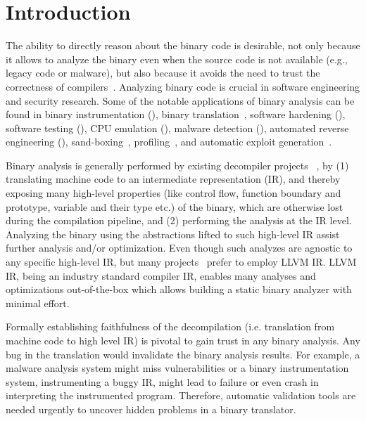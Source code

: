 \section{Introduction}
\label{sec:Intro}

The ability to directly reason about the binary code is desirable, not only because it allows to analyze the binary even when the source code is not available (e.g., legacy code or malware), but also because it avoids the need to trust the correctness of compilers~\cite{Thompson,WYSINWYE}.
Analyzing binary code is crucial in software engineering and security research.
Some of the notable applications of binary analysis can be found in binary
instrumentation
(\cite{Bruening:CGO2003,PEBIL10,Pin:2005,Valgrind:ENTCS03,DynamoRIO:2004}),
binary translation~\cite{UQBT:2000}, software hardening
(\cite{Cha:2015,Ford:2008,Zhang,Zhang:2013}), software testing
(\cite{Chipounov:2011,Avgerinos:2014,godefroid_automated_2008}), CPU
emulation (\cite{QEMU:USENIX05,Magnusson:2002}), malware detection
(\cite{Christodorescu:2005,Kruegel:2004,BitBlaze:2008,BAP:CAV11,Egele:USENIX07,Yin:CCS07}),
automated reverse engineering
(\cite{Cui:2008,Lin:2008,Schwartz:2013,Yakdan2015NDSS,McSema:Recon14,Angr,Radare2}),
sand-boxing~\cite{Kiriansky:2002:SEV,Erlingsson:2006,Yee:2009},
profiling~\cite{Harris:2005,Srivastava:1994}, and automatic exploit
generation~\cite{Cha:2012}.

Binary analysis is generally performed by existing decompiler projects
~\cite{McSema:Recon14,Remill,Angr1,BAP:CAV11,Radare2}, by (1) translating
machine code to an intermediate representation (IR), and thereby exposing many
high-level properties (like control flow, function boundary and prototype,
variable and their type etc.) of the binary, which are otherwise lost
during the compilation pipeline, and (2) performing the analysis at the IR
level.  Analyzing the binary using the abstractions lifted to such high-level
IR assist further analysis and/or optimization. Even though such analyzes are
agnostic to any specific high-level IR, but many
projects~\cite{McSema:Recon14,Remill,FCD,reopt,llvm-mctoll} prefer to employ
LLVM IR. LLVM IR, being an industry standard compiler IR, enables many analyses
and optimizations out-of-the-box which allows building a static binary analyzer
with minimal effort.


Formally establishing faithfulness of the
decompilation (i.e. translation from machine code to high level IR) is pivotal to gain trust
in any binary analysis. Any bug in the translation would invalidate the binary analysis
results. For example, a malware analysis system might miss vulnerabilities or a binary
instrumentation system, instrumenting a buggy IR, might lead to failure or even crash in
interpreting the instrumented program. Therefore, automatic validation tools are needed
urgently to uncover hidden problems in a binary translator.

